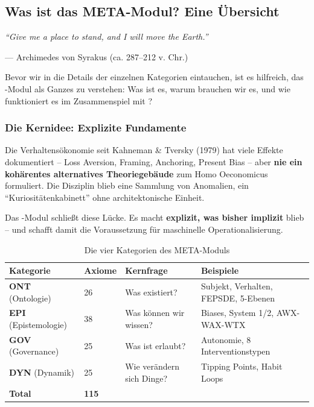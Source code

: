 \subsection{Was ist das META-Modul? Eine Übersicht}

\epigraph{\textit{``Give me a place to stand, and I will move the Earth.''}}{--- Archimedes von Syrakus (ca. 287--212 v. Chr.)}

Bevor wir in die Details der einzelnen Kategorien eintauchen, ist es hilfreich, das \META-Modul als Ganzes zu verstehen: Was ist es, warum brauchen wir es, und wie funktioniert es im Zusammenspiel mit \BEATRIX?

\subsubsection{Die Kernidee: Explizite Fundamente}

Die Verhaltensökonomie seit Kahneman \& Tversky (1979) hat viele Effekte dokumentiert -- Loss Aversion, Framing, Anchoring, Present Bias -- aber \textbf{nie ein kohärentes alternatives Theoriegebäude} zum Homo Oeconomicus formuliert. Die Disziplin blieb eine Sammlung von Anomalien, ein ``Kuriositätenkabinett'' ohne architektonische Einheit.

Das \META-Modul schließt diese Lücke. Es macht \textbf{explizit, was bisher implizit} blieb -- und schafft damit die Voraussetzung für maschinelle Operationalisierung.

\begin{table}[h]
\centering
\caption{Die vier Kategorien des META-Moduls}
\begin{tabular}{@{}llll@{}}
\toprule
\textbf{Kategorie} & \textbf{Axiome} & \textbf{Kernfrage} & \textbf{Beispiele} \\
\midrule
\textbf{ONT} (Ontologie) & 26 & Was existiert? & Subjekt, Verhalten, FEPSDE, 5-Ebenen \\
\textbf{EPI} (Epistemologie) & 38 & Was können wir wissen? & Biases, System 1/2, AWX-WAX-WTX \\
\textbf{GOV} (Governance) & 25 & Was ist erlaubt? & Autonomie, 8 Interventionstypen \\
\textbf{DYN} (Dynamik) & 25 & Wie verändern sich Dinge? & Tipping Points, Habit Loops \\
\midrule
\textbf{Total} & \textbf{115} & & \\
\bottomrule
\end{tabular}
\end{table}


